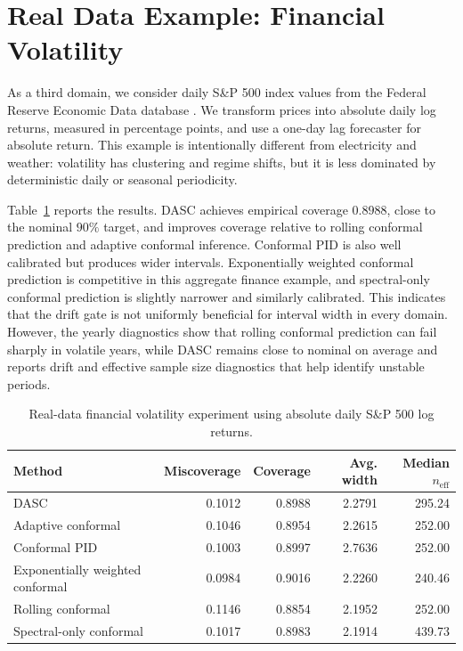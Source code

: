 \documentclass[11pt]{article}
\begin{document}
\section{Real Data Example: Financial Volatility}

As a third domain, we consider daily S\&P 500 index values from the Federal Reserve Economic Data database \citep{fred_sp500}. We transform prices into absolute daily log returns, measured in percentage points, and use a one-day lag forecaster for absolute return. This example is intentionally different from electricity and weather: volatility has clustering and regime shifts, but it is less dominated by deterministic daily or seasonal periodicity.

Table~\ref{tab:real-finance} reports the results. DASC achieves empirical coverage $0.8988$, close to the nominal $90\%$ target, and improves coverage relative to rolling conformal prediction and adaptive conformal inference. Conformal PID is also well calibrated but produces wider intervals. Exponentially weighted conformal prediction is competitive in this aggregate finance example, and spectral-only conformal prediction is slightly narrower and similarly calibrated. This indicates that the drift gate is not uniformly beneficial for interval width in every domain. However, the yearly diagnostics show that rolling conformal prediction can fail sharply in volatile years, while DASC remains close to nominal on average and reports drift and effective sample size diagnostics that help identify unstable periods.

\begin{table}[t]
\centering
\caption{Real-data financial volatility experiment using absolute daily S\&P 500 log returns.}
\label{tab:real-finance}
\begin{tabular}{lrrrr}
\toprule
Method & Miscoverage & Coverage & Avg. width & Median $n_{\mathrm{eff}}$ \\
\midrule
DASC & 0.1012 & 0.8988 & 2.2791 & 295.24 \\
Adaptive conformal & 0.1046 & 0.8954 & 2.2615 & 252.00 \\
Conformal PID & 0.1003 & 0.8997 & 2.7636 & 252.00 \\
Exponentially weighted conformal & 0.0984 & 0.9016 & 2.2260 & 240.46 \\
Rolling conformal & 0.1146 & 0.8854 & 2.1952 & 252.00 \\
Spectral-only conformal & 0.1017 & 0.8983 & 2.1914 & 439.73 \\
\bottomrule
\end{tabular}
\end{table}
\end{document}
